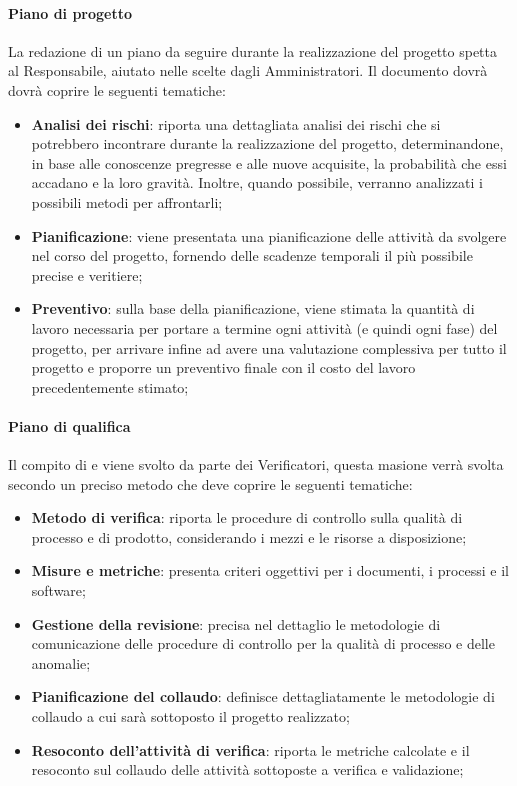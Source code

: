 \paragraph{Piano di progetto}\Spazio
La redazione di un piano da seguire durante la realizzazione del progetto spetta al Responsabile, aiutato nelle scelte dagli Amministratori. Il documento dovrà dovrà coprire le seguenti tematiche:
 \begin{itemize}
 	\item\textbf{{Analisi dei rischi}}: riporta una dettagliata analisi dei rischi che si potrebbero incontrare durante la realizzazione del progetto, determinandone, in base alle conoscenze pregresse e alle nuove acquisite, la probabilità che essi accadano e la loro gravità. Inoltre, quando possibile, verranno analizzati i possibili metodi per affrontarli;
 	\item\textbf{{Pianificazione}}: viene presentata una pianificazione delle attività da svolgere nel corso del progetto, fornendo delle scadenze temporali il più possibile precise e veritiere;
 	\item\textbf{{Preventivo}}: sulla base della pianificazione, viene stimata la quantità di lavoro necessaria per portare a termine ogni attività (e quindi ogni fase) del progetto, per arrivare infine ad avere una valutazione complessiva per tutto il progetto e proporre un preventivo finale con il costo del lavoro precedentemente stimato; 		
 \end{itemize}
\paragraph{Piano di qualifica}\Spazio
Il compito di  e  viene svolto da parte dei Verificatori, questa masione verrà svolta secondo un preciso metodo che deve coprire le seguenti tematiche:
\begin{itemize}
	\item\textbf{{Metodo di verifica}}: riporta le procedure di controllo sulla qualità di processo e di prodotto, considerando i mezzi e le risorse a disposizione; 	
	\item\textbf{{Misure e metriche}}: presenta criteri oggettivi per i documenti, i processi e il software; 	
	\item\textbf{{Gestione della revisione}}: precisa nel dettaglio le metodologie di comunicazione delle procedure di controllo per la qualità di processo e delle anomalie; 	
	\item\textbf{{Pianificazione del collaudo}}: definisce dettagliatamente le metodologie di collaudo a cui sarà sottoposto il progetto realizzato; 	
	\item\textbf{{Resoconto dell'attività di verifica}}: riporta le metriche calcolate e il resoconto sul collaudo delle attività sottoposte a verifica e validazione; 			
\end{itemize}
